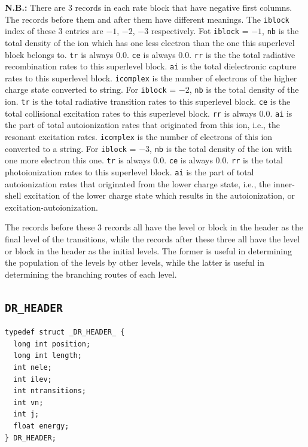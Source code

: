 \documentclass[twoside,letterpaper]{refrep}
\begin{document}
\textbf{N.B.:} There are 3 records in each rate block that have negative first
columns. The records before them and after them have different meanings. The
\texttt{iblock} index of these 3 entries are $-1$, $-2$, $-3$ 
respectively. Fot \texttt{iblock} = $-1$, \texttt{nb} is the total density of
the ion which has one less electron than the one this superlevel block belongs
to. \texttt{tr} is always 0.0. \texttt{ce} is always 0.0. \texttt{rr} is the
the total radiative recombination rates to this superlevel block. \texttt{ai}
is the total dielectronic capture rates to this superlevel
block. \texttt{icomplex} is the number of electrons of the higher charge state
converted to string. For \texttt{iblock} = $-2$, \texttt{nb} is the total
density of the ion. \texttt{tr} is the total radiative transition rates to
this superlevel block. \texttt{ce} is the total collisional excitation rates
to this superlevel block. \texttt{rr} is always 0.0. \texttt{ai} is the part
of total autoionization rates that originated from this ion, i.e., the
resonant excitation rates. \texttt{icomplex} is the number of electrons of
this ion converted to a string. For \texttt{iblock} = $-3$, \texttt{nb} is the
total density of the ion with one more electron this one. \texttt{tr} is
always 0.0. \texttt{ce} is always 0.0. \texttt{rr} is the total
photoionization rates to this superlevel block. \texttt{ai} is the part of
total autoionization rates that originated from the lower charge state, i.e.,
the inner-shell excitation of the lower charge state which results in the
autoionization, or excitation-autoionization.

The records before these 3 records all have the level or block in the header
as the final level of the transitions, while the records after these three all
have the level or block in the header as the initial levels. The former is
useful in determining the population of the levels by other levels, while the
latter is useful in determining the branching routes of each level.

\subsection{\texttt{DR\_HEADER}}
\begin{verbatim}	
typedef struct _DR_HEADER_ {
  long int position;
  long int length;
  int nele;
  int ilev;
  int ntransitions;
  int vn;
  int j;
  float energy;
} DR_HEADER;
\end{verbatim}
\end{document}
